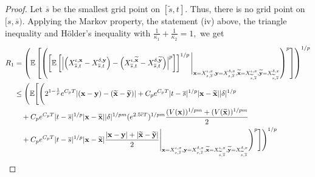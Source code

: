 \documentclass[11pt]{article}
\theoremstyle{theorem}
\theoremstyle{definition}
\newcommand{\bR}{\mathbb{R}}
\newcommand{\1}{{\bf 1}}
\begin{document}
\begin{proof}
Let $\overline{s}$ be the smallest grid point on $[\widetilde{s}, t].$
Thus, there is no grid point on $[s, \overline{s}).$ Applying the Markov property, the statement (iv) above, the triangle inequality and H\"older's inequality with  $\frac{1}{\kappa_1}+\frac{1}{\kappa_2}=1,$ we get
\begin{align*}
R_1&=\left(\mathbb{E}\left[\left(\left[\mathbb{E}\left[\left|\left(X^{\iota, \mathbf{x}}_{\overline{s},t}-X^{\delta,\mathbf{y}}_{\overline{s},t}\right) - \left(X^{\iota, \mathbf{\widetilde{x}}}_{\overline{s},t}-X^{\delta, \mathbf{\widetilde{y}}}_{\overline{s},t}\right)\right|^p\right]\right]^{1/p}\Bigg| _{\mathbf{x}= X_{s, \overline{s}}^{\iota, x}, \mathbf{y}= X_{s, \overline{s}}^{\delta, x}, \mathbf{\widetilde{x}}= X_{\widetilde{s}, \overline{s}}^{\iota, x}, \mathbf{\widetilde{y}}= X_{\widetilde{s}, \overline{s}}^{\delta, x}}\right)^p\right]\right)^{1/p} \notag\\
& \leq  \Bigg( \mathbb{E}\Bigg[\Bigg(  2^{1-\frac{1}{p}} e^{C_p T} |(\mathbf{x} - \mathbf{y}) - (\mathbf{\widetilde{x}}-\mathbf{\widetilde{y}})| + C_p e^{C_p T} |t-\overline{s}|^{1/p} |\mathbf{x}-\mathbf{\widetilde{x}}| |\delta|^{1/p}  \notag\\ 
& \quad + C_p e^{C_p T} |t-\overline{s}|^{1/p} |\mathbf{x}-\mathbf{\widetilde{x}}|   |\delta|^{1/pm} (e^{2.5\overline{c}T})^{1/pm} \frac{  (V(\mathbf{x}))^{1/pm}+(V(\mathbf{\widetilde{x}}))^{1/pm}}{2} \notag\\
& \quad + C_p e^{C_p T} |t-\overline{s}|^{1/p} |\mathbf{x}-\mathbf{\widetilde{x}}| \dfrac{|\mathbf{x}-\mathbf{y}|+ |\mathbf{\widetilde{x}}-\mathbf{\widetilde{y}}|}{2}   \Bigg|_{\mathbf{x}= X_{s, \overline{s}}^{\iota, x}, \mathbf{y}= X_{s, \overline{s}}^{\delta, x}, \mathbf{\widetilde{x}}= X_{\widetilde{s}, \overline{s}}^{\iota, x}, \mathbf{\widetilde{y}}= X_{\widetilde{s}, \overline{s}}^{\delta, x}}\Bigg)^p\Bigg]\Bigg)^{1/p} \notag\\

\end{align*}
\end{proof}
\end{document}
